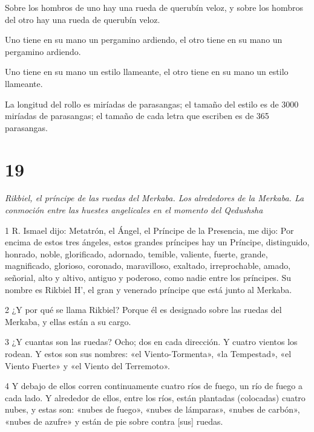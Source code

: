 \par Sobre los hombros de uno hay una rueda de querubín veloz, y sobre los hombros del otro hay una rueda de querubín veloz.

\par Uno tiene en su mano un pergamino ardiendo, el otro tiene en su mano un pergamino ardiendo.

\par Uno tiene en su mano un estilo llameante, el otro tiene en su mano un estilo llameante.

\par La longitud del rollo es miríadas de parasangas; el tamaño del estilo es de 3000 miríadas de parasangas; el tamaño de cada letra que escriben es de 365 parasangas.

\chapter{19}

\par \textit{Rikbiel, el príncipe de las ruedas del Merkaba. Los alrededores de la Merkaba. La conmoción entre las huestes angelicales en el momento del Qedushsha}

\par 1 R. Ismael dijo: Metatrón, el Ángel, el Príncipe de la Presencia, me dijo: Por encima de estos tres ángeles, estos grandes príncipes hay un Príncipe, distinguido, honrado, noble, glorificado, adornado, temible, valiente, fuerte, grande, magnificado, glorioso, coronado, maravilloso, exaltado, irreprochable, amado, señorial, alto y altivo, antiguo y poderoso, como nadie entre los príncipes. Su nombre es Rikbiel H', el gran y venerado príncipe que está junto al Merkaba.

\par 2 ¿Y por qué se llama Rikbiel? Porque él es designado sobre las ruedas del Merkaba, y ellas están a su cargo.

\par 3 ¿Y cuantas son las ruedas? Ocho; dos en cada dirección. Y cuatro vientos los rodean. Y estos son sus nombres: «el Viento-Tormenta», «la Tempestad», «el Viento Fuerte» y «el Viento del Terremoto».

\par 4 Y debajo de ellos corren continuamente cuatro ríos de fuego, un río de fuego a cada lado. Y alrededor de ellos, entre los ríos, están plantadas (colocadas) cuatro nubes, y estas son: «nubes de fuego», «nubes de lámparas», «nubes de carbón», «nubes de azufre» y están de pie sobre contra [sus] ruedas.

